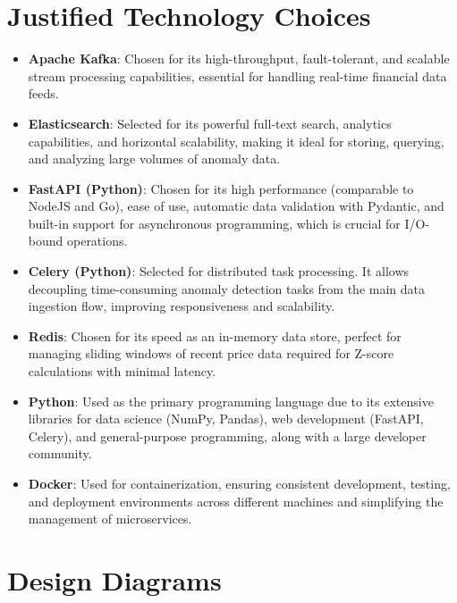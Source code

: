 \section{Justified Technology Choices}

\begin{itemize}
    \item \textbf{Apache Kafka}: Chosen for its high-throughput, fault-tolerant, and scalable stream processing capabilities, essential for handling real-time financial data feeds.
    
    \item \textbf{Elasticsearch}: Selected for its powerful full-text search, analytics capabilities, and horizontal scalability, making it ideal for storing, querying, and analyzing large volumes of anomaly data.
    
    \item \textbf{FastAPI (Python)}: Chosen for its high performance (comparable to NodeJS and Go), ease of use, automatic data validation with Pydantic, and built-in support for asynchronous programming, which is crucial for I/O-bound operations.
    
    \item \textbf{Celery (Python)}: Selected for distributed task processing. It allows decoupling time-consuming anomaly detection tasks from the main data ingestion flow, improving responsiveness and scalability.
    
    \item \textbf{Redis}: Chosen for its speed as an in-memory data store, perfect for managing sliding windows of recent price data required for Z-score calculations with minimal latency.
    
    \item \textbf{Python}: Used as the primary programming language due to its extensive libraries for data science (NumPy, Pandas), web development (FastAPI, Celery), and general-purpose programming, along with a large developer community.
    
    \item \textbf{Docker}: Used for containerization, ensuring consistent development, testing, and deployment environments across different machines and simplifying the management of microservices.
\end{itemize}

\section{Design Diagrams}

